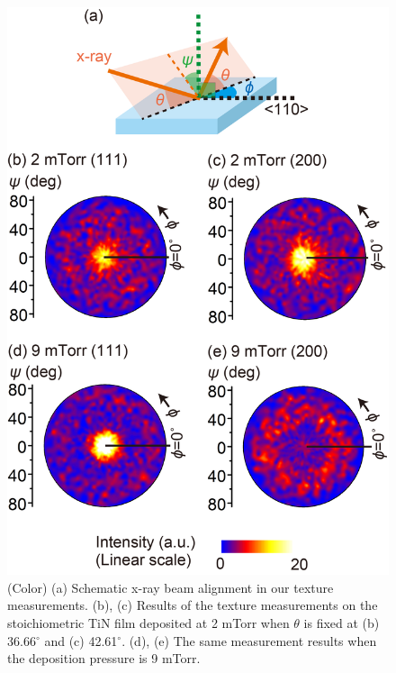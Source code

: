 \begin{figure}
\begin{center}
\includegraphics[width=125mm]{Texture.jpg}
\end{center}
\caption{(Color) (a) Schematic x-ray beam alignment in our texture measurements. (b), (c) Results of the texture measurements on the stoichiometric TiN film deposited at 2 mTorr when $\theta$ is fixed at (b) 36.66$^{\circ}$ and (c) 42.61$^{\circ}$. (d), (e) The same measurement results when the deposition pressure is 9 mTorr.}
\label{Texture}
\end{figure}

